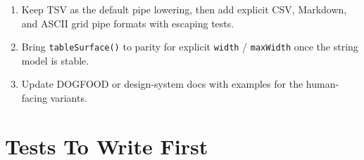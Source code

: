 \begin{enumerate}
  Render \texttt{b\allowbreak{}o\allowbreak{}x}, \texttt{a\allowbreak{}s\allowbreak{}c\allowbreak{}i\allowbreak{}i\allowbreak{}-\allowbreak{}g\allowbreak{}r\allowbreak{}i\allowbreak{}d}, \texttt{r\allowbreak{}u\allowbreak{}l\allowbreak{}e\allowbreak{}d}, \texttt{h\allowbreak{}e\allowbreak{}a\allowbreak{}d\allowbreak{}e\allowbreak{}r\allowbreak{}-\allowbreak{}r\allowbreak{}u\allowbreak{}l\allowbreak{}e}, \texttt{p\allowbreak{}l\allowbreak{}a\allowbreak{}i\allowbreak{}n}, \texttt{m\allowbreak{}a\allowbreak{}r\allowbreak{}k\allowbreak{}d\allowbreak{}o\allowbreak{}w\allowbreak{}n}, and \texttt{d\allowbreak{}e\allowbreak{}f\allowbreak{}i\allowbreak{}n\allowbreak{}i\allowbreak{}t\allowbreak{}i\allowbreak{}o\allowbreak{}n} from the fitted model.
\item
  Keep TSV as the default pipe lowering, then add explicit CSV, Markdown, and ASCII grid pipe formats with escaping tests.
\item
  Bring \texttt{t\allowbreak{}a\allowbreak{}b\allowbreak{}l\allowbreak{}e\allowbreak{}S\allowbreak{}u\allowbreak{}r\allowbreak{}f\allowbreak{}a\allowbreak{}c\allowbreak{}e\allowbreak{}(\allowbreak{})} to parity for explicit \texttt{w\allowbreak{}i\allowbreak{}d\allowbreak{}t\allowbreak{}h} / \texttt{m\allowbreak{}a\allowbreak{}x\allowbreak{}W\allowbreak{}i\allowbreak{}d\allowbreak{}t\allowbreak{}h} once the string model is stable.
\item
  Update DOGFOOD or design-system docs with examples for the human-facing variants.
\end{enumerate}

\section{Tests To Write First}\label{record-133-tests-to-write-first}


